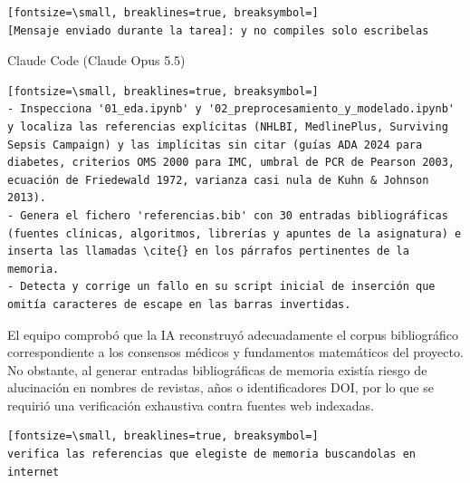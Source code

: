 \documentclass[12pt,a4paper,oneside]{book}
\begin{document}
\begin{iaprompt}
\begin{iaprompt}
\begin{Verbatim}[fontsize=\small, breaklines=true, breaksymbol=]
[Mensaje enviado durante la tarea]: y no compiles solo escribelas
\end{Verbatim}
\end{iaprompt}
\begin{iaresp}{Claude Code (Claude Opus 5.5)}
\begin{Verbatim}[fontsize=\small, breaklines=true, breaksymbol=]
- Inspecciona '01_eda.ipynb' y '02_preprocesamiento_y_modelado.ipynb' y localiza las referencias explícitas (NHLBI, MedlinePlus, Surviving Sepsis Campaign) y las implícitas sin citar (guías ADA 2024 para diabetes, criterios OMS 2000 para IMC, umbral de PCR de Pearson 2003, ecuación de Friedewald 1972, varianza casi nula de Kuhn & Johnson 2013).
- Genera el fichero 'referencias.bib' con 30 entradas bibliográficas (fuentes clínicas, algoritmos, librerías y apuntes de la asignatura) e inserta las llamadas \cite{} en los párrafos pertinentes de la memoria.
- Detecta y corrige un fallo en su script inicial de inserción que omitía caracteres de escape en las barras invertidas.
\end{Verbatim}
\end{iaresp}
\begin{iaanalisis}
El equipo comprobó que la IA reconstruyó adecuadamente el corpus bibliográfico correspondiente a los consensos médicos y fundamentos matemáticos del proyecto. No obstante, al generar entradas bibliográficas de memoria existía riesgo de alucinación en nombres de revistas, años o identificadores DOI, por lo que se requirió una verificación exhaustiva contra fuentes web indexadas.
\end{iaanalisis}


\begin{iaprompt}
\begin{Verbatim}[fontsize=\small, breaklines=true, breaksymbol=]
verifica las referencias que elegiste de memoria buscandolas en internet


\end{Verbatim}
\end{iaprompt}
\end{iaprompt}
\end{document}
